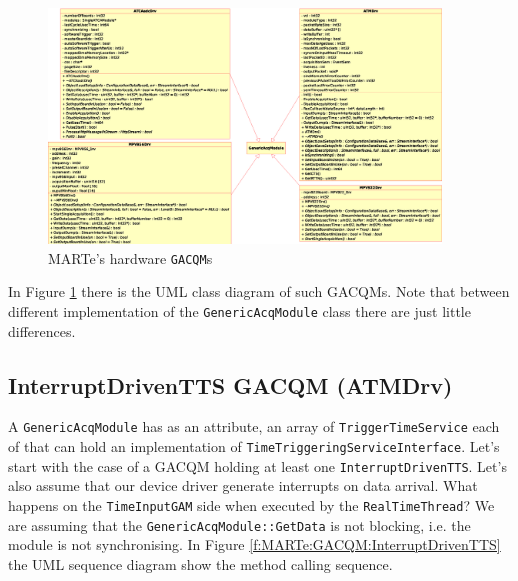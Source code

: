 \begin{figure}[h!]
 \begin{center}
  \includegraphics[width=0.93\textwidth]{MARTe/IOGAMs-Drv-Acq.eps}
  \caption{MARTe's hardware \texttt{GACQM}s}
  \label{f:MARTe:IOGAMs_Acq}
 \end{center}
\end{figure}

In Figure \ref{f:MARTe:IOGAMs_Acq} there is the UML class diagram of such GACQMs. Note that between different implementation of the \texttt{GenericAcqModule} class there are just little differences. \\



\subsection{InterruptDrivenTTS GACQM (ATMDrv)}
A \texttt{GenericAcqModule} has as an attribute, an array of \texttt{TriggerTimeService} each of that can hold an implementation of \texttt{TimeTriggeringServiceInterface}. Let's start with the case of a GACQM holding at least one \texttt{InterruptDrivenTTS}. Let's also assume that our device driver generate interrupts on data arrival. What happens on the \texttt{TimeInputGAM} side when executed by the \texttt{RealTimeThread}? We are assuming that the \texttt{GenericAcqModule::GetData} is not blocking, i.e. the module is not synchronising. In Figure \ref{f:MARTe:GACQM:InterruptDrivenTTS} the UML sequence diagram show the method calling sequence.

